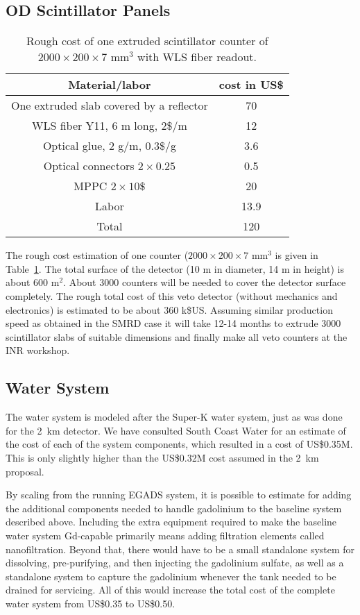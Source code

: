 \subsection{OD Scintillator Panels}
 
\begin{table}[h!]
 \caption{Rough cost of one extruded scintillator counter of $2000 \times 200 \times 7$ mm$^3$ with WLS fiber readout.}
 \label{tab:scintcost}
 \begin{center} 
 \begin{tabular}{|c|c|} \hline
  Material/labor & cost in US\$ \\ 
  \hline\hline
  One extruded slab covered by a reflector  &   70 \\ \hline
  WLS fiber Y11, 6 m long, 2\$/m & 12  \\ \hline
  Optical glue, 2 g/m, 0.3\$/g &   3.6 \\ \hline
  Optical connectors $2 \times 0.25$ & 0.5  \\ \hline
  MPPC $2 \times 10\$$ & 20 \\ \hline
  Labor  &  13.9 \\ \hline
  \hline
  Total  &  120 \\
  \hline 
 \end{tabular}
 \end{center}
\end{table}
The rough cost estimation of one counter ($2000 \times 200 \times 7$ mm$^3$ is  given in Table~\ref{tab:scintcost}. The total surface of the \nuprism detector (10 m in diameter, 14 m in height) is about 600 m$^2$.   About 3000 counters will be needed to cover the detector surface completely. The rough total cost of this veto detector (without mechanics and electronics) is estimated to be about 360 k\$US. Assuming similar production speed as obtained in the SMRD case it  will take 12-14 months to extrude 3000 scintillator slabs of suitable dimensions and finally make all veto counters at the INR workshop. 

\subsection{Water System}

The water system is modeled after the Super-K water system, just as was done for the 2~km detector. We have consulted South Coast Water for an estimate of the cost of each of the system components, which resulted in a cost of US\$0.35M. This is only slightly higher than the US\$0.32M cost assumed in the 2~km proposal.

By scaling from the running EGADS system, it is possible to estimate for adding 
the additional components needed to handle gadolinium to the baseline system described above.
Including the extra equipment required to make the baseline water system Gd-capable primarily 
means adding filtration elements called nanofiltration.  Beyond that, there would have to be 
a small standalone system for dissolving, pre-purifying, and then injecting the gadolinium sulfate, 
as well as a standalone system to capture the gadolinium whenever the \nuprism tank needed 
to be drained for servicing.  All of this would increase the total cost of the complete \nuprism water
system from  US\$0.35 to US\$0.50.

